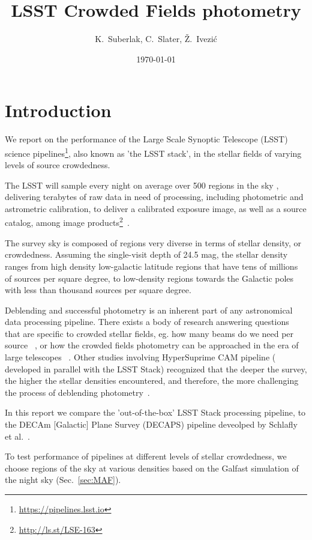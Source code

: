 \documentclass[DM,lsstdraft,toc,usenatbib]{lsstdoc}
\title[Crowded fields ]{LSST  Crowded Fields photometry}
\author{
K.~Suberlak, C.~Slater, \v{Z}.~Ivezi\'c}
\date{\today}
\begin{document}
\maketitle

\section{Introduction}

We report on the performance of the Large Scale Synoptic Telescope (LSST) science pipelines\footnote{\url{https://pipelines.lsst.io}}, also known as 'the LSST stack', in the stellar fields of varying levels of source crowdedness.

The LSST will sample every night on average over 500  regions in the sky , delivering terabytes of raw data in need of processing, including photometric  and astrometric calibration, to deliver a calibrated exposure image, as well as a source catalog, among image products\footnote{\url{http://ls.st/LSE-163}}~\cite{narayan2018}.

The survey sky is composed of regions very diverse in terms of stellar density, or crowdedness. Assuming the single-visit depth of 24.5 mag, the stellar density ranges from high density low-galactic latitude regions that have tens of millions of sources per square degree, to low-density regions towards the Galactic poles with less than thousand sources per square degree. 

Deblending and successful photometry is an inherent part of any astronomical data processing pipeline.  There exists a body of research answering questions that are specific to crowded stellar fields, eg. how many beams do we need per source ~\citep{hogg2001}, or how  the crowded fields photometry can be approached in the era of large telescopes ~\cite{olsen2003}. Other studies involving HyperSuprime CAM pipeline ( developed in parallel with the LSST Stack) recognized that the deeper the survey, the higher the stellar densities encountered, and therefore, the more challenging the process of deblending photometry~\cite{bosch2017}.

In this report we compare the 'out-of-the-box' LSST Stack processing pipeline, to the DECAm [Galactic] Plane Survey (DECAPS) pipeline deveolped by Schlafly et al.~\cite{schlafly2017}. 

To test performance of pipelines at different levels of stellar crowdedness, we choose regions of the sky at various densities based on the Galfast simulation of the night sky (Sec.~\ref{sec:MAF}). 
\end{document}
